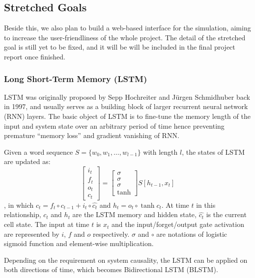 \documentclass[conference]{IEEEtran}
\begin{document}
\subsection{Stretched Goals}
\label{model:stretch}
    
    Beside this, we also plan to build a web-based interface for the simulation, aiming
    to increase the user-friendliness of the whole project. The detail of the stretched
    goal is still yet to be fixed, and it will be will be included in the final project
    report once finished. 

\subsubsection{Long Short-Term Memory (LSTM)}
\label{model:stretch:lstm}
    LSTM was originally proposed by Sepp Hochreiter and J\"urgen Schmidhuber back in 
    1997\cite{hochreiter1997long}, and usually serves as a building block of larger
    recurrent neural network (RNN) layers. The basic object of LSTM is to fine-tune
    the memory length of the input and system state over an arbitrary period of time
    hence preventing premature ``memory loss'' and gradient vanishing of RNN.
    
    Given a word sequence $S=\{w_0,w_1,\ldots,w_{l-1}\}$ with length $l$, the states
    of LSTM are updated as:
    $$
    \begin{bmatrix} 
    i_t\\f_t\\o_t\\c_t 
    \end{bmatrix} = 
    \begin{bmatrix}
    \sigma\\\sigma\\\sigma\\\tanh
    \end{bmatrix}
    S[h_{t-1},x_t]
    $$
    , in which $c_t=f_t\circ c_{t-1} + i_t\circ\hat{c_t}$ and $h_t=o_t\circ\tanh{c_t}$.
    At time $t$ in this relationship, $c_t$ and $h_t$ are the LSTM memory and 
    hidden state, $\hat{c_t}$ is the current cell state. The input at time $t$ 
    is $x_t$ and the input/forget/output gate activation are represented by $i$, 
    $f$ and $o$ respectively. $\sigma$ and $\circ$ are notations of logistic 
    sigmoid function and element-wise multiplication\cite{zhou2016text}.
    
    Depending on the requirement on system causality, the LSTM can be applied on
    both directions of time, which becomes Bidirectional LSTM 
    (BLSTM)\cite{schuster1997bidirectional,barnes2017assessing}.
\end{document}
